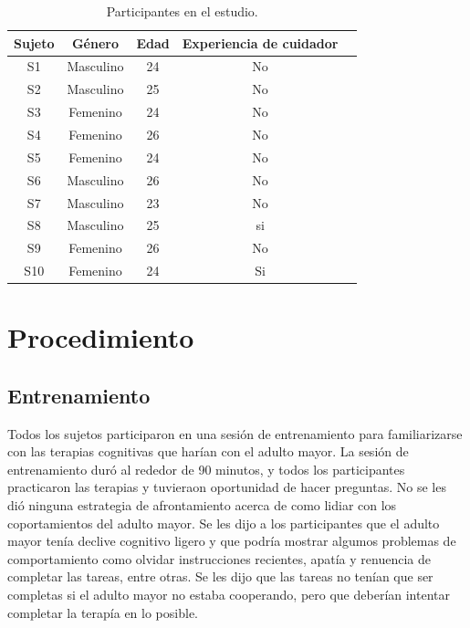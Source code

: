 \begin{table}[h]
\centering
\caption{Participantes en el estudio.}
\label{table:kysymys}
\begin{tabular}{|c|c|c|c|c|}
\hline
 \textbf{Sujeto}&  \textbf{G\'enero}&  \textbf{Edad}&  \textbf{Experiencia de cuidador}  \\ \hline
 S1& Masculino & 24 & No   \\ \hline
 S2& Masculino &  25&  No  \\ \hline
 S3& Femenino & 24 & No   \\ \hline
 S4& Femenino & 26 & No  \\ \hline
 S5& Femenino & 24 & No   \\ \hline
 S6& Masculino & 26 &  No  \\ \hline
 S7& Masculino & 23 &  No \\ \hline
 S8& Masculino & 25 &  si  \\ \hline
 S9& Femenino & 26 & No   \\ \hline
 S10& Femenino & 24 & Si  \\ \hline
\end{tabular}
\end{table}
\section{Procedimiento}
\subsection{Entrenamiento}
Todos los sujetos participaron en una sesi\'on de entrenamiento para familiarizarse con las terapias cognitivas que har\'ian con el adulto mayor. La sesi\'on de entrenamiento dur\'o al rededor de 90 minutos, y todos los participantes practicaron las terapias y tuvieraon oportunidad de hacer preguntas. No se les di\'o ninguna estrategia de afrontamiento acerca de como lidiar con los coportamientos del adulto mayor. Se les dijo a los participantes que el adulto mayor ten\'ia declive cognitivo ligero y que podr\'ia mostrar algumos problemas de comportamiento como olvidar instrucciones recientes, apat\'ia y renuencia de completar las tareas, entre otras. Se les dijo que las tareas no ten\'ian que ser completas si el adulto mayor no estaba cooperando, pero que deber\'ian intentar completar la terap\'ia en lo posible.

